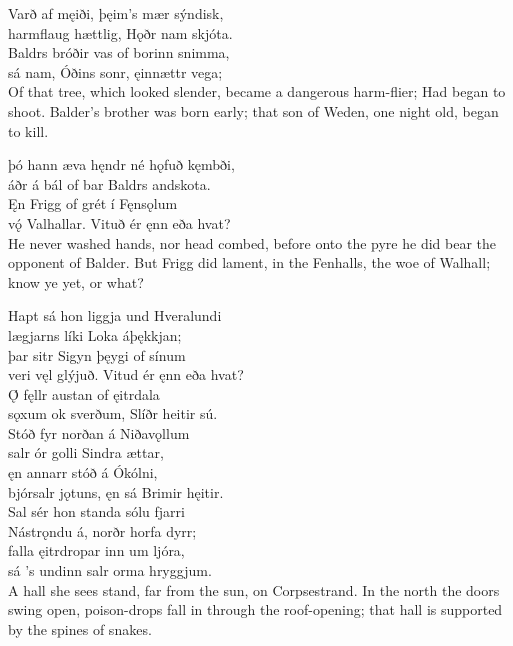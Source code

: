 \bva Varð af męiði, \hld þęim's mær sýndisk, \\%
harmflaug hættlig, \hld Hǫðr nam skjóta. \\%
Baldrs bróðir vas \hld of borinn snimma, \\%
sá nam, Óðins sonr, \hld ęinnættr vega;\\%

\bvb Of that tree, which looked slender, became a dangerous harm-flier; Had began to shoot. Balder's brother was born early; that son of Weden, one night old, began to kill.

\bva þó hann æva hęndr \hld né hǫfuð kęmbði, \\%
áðr á bál of bar \hld Baldrs andskota. \\%
Ęn Frigg of grét \hld í Fęnsǫlum \\%
vǫ́ Valhallar. \hld Vituð ér ęnn eða hvat?\\%

\bvb He never washed hands, nor head combed, before onto the pyre he did bear the opponent of Balder. But Frigg did lament, in the Fenhalls, the woe of Walhall; know ye yet, or what?

\bva Hapt sá hon liggja \hld und Hveralundi \\%
lægjarns líki \hld Loka áþękkjan; \\%
þar sitr Sigyn \hld þęygi of sínum \\%
veri vęl glýjuð. \hld Vitud ér ęnn eða hvat?\\%

\bva Ǫ́ fęllr austan \hld of ęitrdala \\%
sǫxum ok sverðum, \hld Slíðr heitir sú.\\%

\bva Stóð fyr norðan \hld á Niðavǫllum \\%
salr ór golli \hld Sindra ættar, \\%
ęn annarr stóð \hld á Ókólni, \\%
bjórsalr jǫtuns, \hld ęn sá Brimir hęitir.\\%

\bva Sal sér hon standa \hld sólu fjarri \\%
Nástrǫndu á, \hld norðr horfa dyrr; \\%
falla ęitrdropar \hld inn um ljóra, \\%
sá ’s undinn salr \hld orma hryggjum.\\%

\bvb A hall she sees stand, far from the sun, on Corpsestrand. In the north the doors swing open, poison-drops fall in through the roof-opening; that hall is supported by the spines of snakes.

